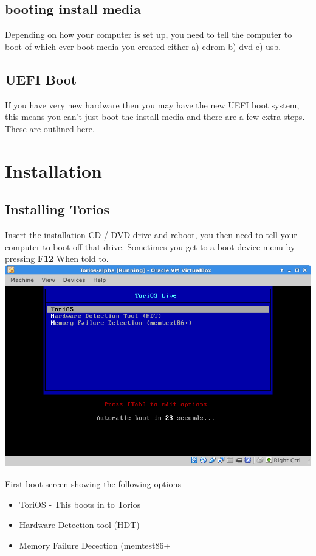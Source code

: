 \documentclass[12pt,a4paper]{book}
\begin{document}
\subsection{booting install media}
Depending on how your computer is set up,  you need to tell the computer to boot of which ever boot media you created either a) cdrom b) dvd c) usb.

\subsection{UEFI Boot}
If you have very new hardware then you may have the new UEFI boot system,  this means you can't just boot the install media and there are a few extra steps.  These are outlined here.

\newpage
\section{Installation}

\subsection{Installing Torios}

Insert the installation CD / DVD drive and reboot, you then need to tell your computer to boot off that drive.  Sometimes you get to a boot device menu by pressing \textbf{F12} When told to.  \\

\includegraphics[width=0.7\linewidth]{boot-screen1}

First boot screen showing the following options \\

\begin{itemize}
\item{ToriOS - This boots in to Torios} 
\item{Hardware Detection tool (HDT)}
\item{Memory Failure Decection (memtest86+}
\end{itemize}
\end{document}
